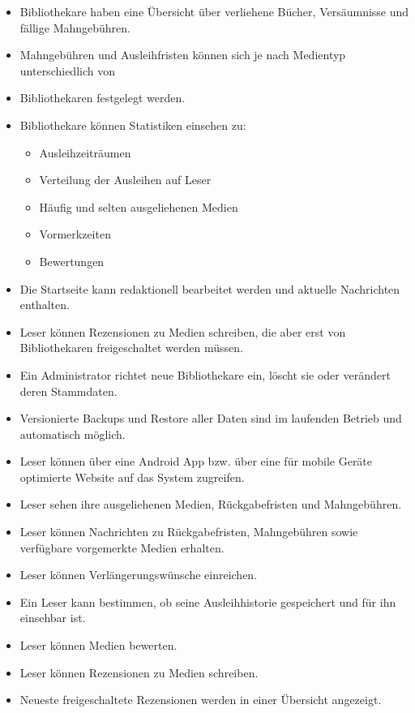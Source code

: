 \documentclass[fontsize=12pt,paper=a4,twoside]{scrartcl}
\begin{document}
\begin{itemize}
	\item Bibliothekare haben eine Übersicht über verliehene Bücher, Versäumnisse und fällige Mahngebühren. 
	\item Mahngebühren und Ausleihfristen können sich je nach Medientyp unterschiedlich von 
	\item Bibliothekaren festgelegt werden. 
	\item Bibliothekare können Statistiken einsehen zu: 
	\begin{itemize}
		\item Ausleihzeiträumen 
		\item Verteilung der Ausleihen auf Leser 
		\item Häufig und selten ausgeliehenen Medien 
		\item Vormerkzeiten 
		\item Bewertungen 
	\end{itemize}
	\item Die Startseite kann redaktionell bearbeitet werden und aktuelle Nachrichten enthalten. 
	\item Leser können Rezensionen zu Medien schreiben, die aber erst von Bibliothekaren freigeschaltet werden müssen. 
	\item Ein Administrator richtet neue Bibliothekare ein, löscht sie oder verändert deren Stammdaten. 
	\item Versionierte Backups und Restore aller Daten sind im laufenden Betrieb und automatisch möglich. 
	\item Leser können über eine Android App bzw. über eine für mobile Geräte optimierte Website auf das System zugreifen. 
	\item Leser sehen ihre ausgeliehenen Medien, Rückgabefristen und Mahngebühren. 
	\item Leser können Nachrichten zu Rückgabefristen, Mahngebühren sowie verfügbare vorgemerkte Medien erhalten. 
	\item Leser können Verlängerungswünsche einreichen. 
	\item Ein Leser kann bestimmen, ob seine Ausleihhistorie gespeichert und für ihn einsehbar ist. 
	\item Leser können Medien bewerten. 
	\item Leser können Rezensionen zu Medien schreiben. 
	\item Neueste freigeschaltete Rezensionen werden in einer Übersicht angezeigt. 
\end{itemize}
\end{document}
